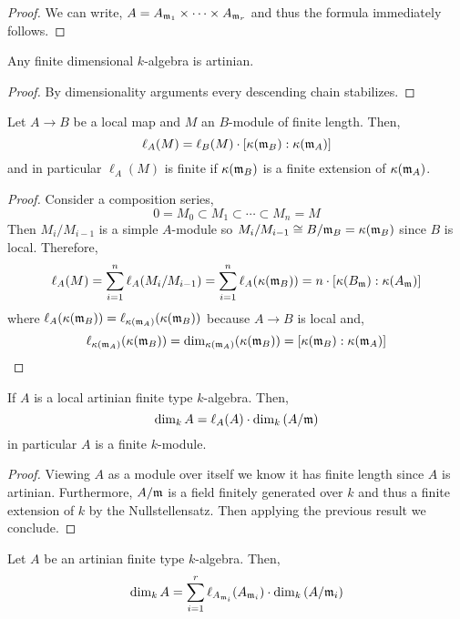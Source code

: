 \documentclass[12pt]{article}
\begin{document}
\begin{proof}
We can write, $A = A_{\mathfrak{m}_1} \times \cdots \times A_{\mathfrak{m}_r}$ and thus the formula immediately follows.
\end{proof}


\begin{prop}
Any finite dimensional $k$-algebra is artinian.
\end{prop}

\begin{proof}
By dimensionality arguments every descending chain stabilizes. 
\end{proof}

\begin{prop}
Let $A \to B$ be a local map and $M$ an $B$-module of finite length. Then,
\[ \ell_A(M) = \ell_B(M) \cdot [ \kappa(\mathfrak{m}_B) : \kappa(\mathfrak{m}_A) ] \]
and in particular $\ell_A(M)$ is finite if $\kappa(\mathfrak{m}_B)$ is a finite extension of $\kappa(\mathfrak{m}_A)$.
\end{prop}

\begin{proof}
Consider a composition series,
\[ 0 = M_0 \subset M_{1} \subset \cdots \subset M_n = M \]
Then $M_i / M_{i - 1}$ is a simple $A$-module so $M_i / M_{i-1} \cong B / \mathfrak{m}_B = \kappa(\mathfrak{m}_B)$ since $B$ is local. Therefore,
\[ \ell_A(M) = \sum_{i = 1}^n \ell_A (M_i / M_{i-1}) = \sum_{i = 1}^n \ell_A(\kappa(\mathfrak{m}_B)) = n \cdot [ \kappa(B_{\mathfrak{m}}) : \kappa(A_{\mathfrak{m}}) ] \]
where $\ell_A(\kappa(\mathfrak{m}_B)) = \ell_{\kappa(\mathfrak{m}_A)}(\kappa(\mathfrak{m}_B))$ because $A \to B$ is local and,
\[ \ell_{\kappa(\mathfrak{m}_A)}(\kappa(\mathfrak{m}_B)) = \dim_{\kappa(\mathfrak{m}_A)}(\kappa(\mathfrak{m}_B)) = [\kappa(\mathfrak{m}_B) : \kappa(\mathfrak{m}_A)] \]
\end{proof}

\begin{cor}
If $A$ is a local artinian finite type $k$-algebra. Then,
\[ \dim_k{A} = \ell_A(A) \cdot \dim_k{(A / \mathfrak{m})} \]
in particular $A$ is a finite $k$-module. 
\end{cor}

\begin{proof}
Viewing $A$ as a module over itself we know it has finite length since $A$ is artinian. Furthermore, $A / \mathfrak{m}$ is a field finitely generated over $k$ and thus a finite extension of $k$ by the Nullstellensatz. Then applying the previous result we conclude. 
\end{proof}

\begin{cor}
Let $A$ be an artinian finite type $k$-algebra. Then,
\[ \dim_k{A} = \sum_{i = 1}^r \ell_{A_{\mathfrak{m}_i}}(A_{\mathfrak{m}_i}) \cdot \dim_k{(A / \mathfrak{m}_i)} \]
\end{cor}
\end{document}
